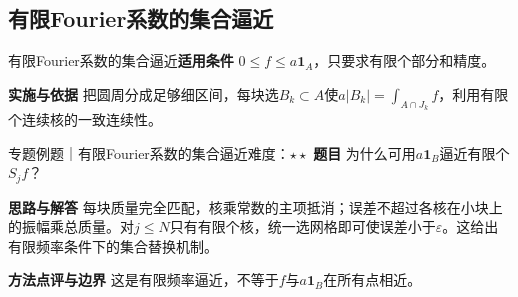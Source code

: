\subsection{有限Fourier系数的集合逼近}\label{mat:fourier_advanced:antonov}
\begin{method}{有限Fourier系数的集合逼近}\textbf{适用条件} $0\le f\le a\mathbf1_A$，只要求有限个部分和精度。\par\textbf{实施与依据} 把圆周分成足够细区间，每块选$B_k\subset A$使$a|B_k|=\int_{A\cap J_k}f$，利用有限个连续核的一致连续性。\end{method}
\begin{example}{专题例题｜有限Fourier系数的集合逼近}{难度：$\star\star$}
\textbf{题目} 为什么可用$a\mathbf1_B$逼近有限个$S_jf$？\par\textbf{思路与解答} 每块质量完全匹配，核乘常数的主项抵消；误差不超过各核在小块上的振幅乘总质量。对$j\le N$只有有限个核，统一选网格即可使误差小于$\varepsilon$。这给出有限频率条件下的集合替换机制。\par\textbf{方法点评与边界} 这是有限频率逼近，不等于$f$与$a\mathbf1_B$在所有点相近。
\end{example}
